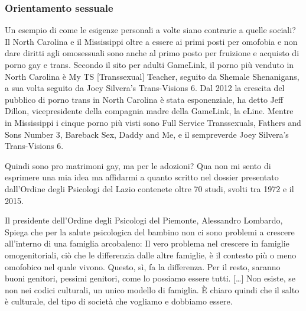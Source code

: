 \documentclass[12pt]{book} %
\begin{document}
\begin{mdframed}
\subsubsection{Orientamento sessuale}

Un esempio di come le esigenze personali a volte siano contrarie a quelle sociali? Il North Carolina e il Mississippi
oltre a essere ai primi posti per omofobia e non dare diritti agli omosessuali sono anche al primo posto per fruizione
e acquisto di porno gay e trans. Secondo il sito per adulti GameLink, il porno più venduto in North Carolina è My TS
[Transsexual] Teacher, seguito da Shemale Shenanigans, a sua volta seguito da Joey Silvera's Trans-Visions 6.
{\textquotedbl}Dal 2012 la crescita del pubblico di porno trans in North Carolina è stata esponenziale,{\textquotedbl}
ha detto Jeff Dillon, vicepresidente della compagnia madre della GameLink, la eLine. Mentre in Mississippi i cinque
porno più visti sono Full Service Transsexuals, Fathers and Sons Number 3, Bareback Sex, Daddy and Me, e il sempreverde
Joey Silvera's Trans-Visions
6.

Quindi sono pro matrimoni gay, ma per le adozioni? Qua non mi sento di esprimere una mia idea ma affidarmi a quanto
scritto nel
dossier presentato dall'Ordine degli Psicologi del Lazio contenete oltre 70 studi, svolti tra 1972 e il 2015. 

Il presidente dell'Ordine degli Psicologi del Piemonte, Alessandro Lombardo, Spiega che per la salute psicologica del
bambino non ci sono problemi a crescere all'interno di una famiglia arcobaleno: {\textquotedbl}Il
vero problema nel crescere in famiglie omogenitoriali, ciò che le differenzia dalle altre famiglie, è il contesto più o
meno omofobico nel quale vivono. Questo, sì, fa la differenza. Per il resto, saranno buoni genitori, pessimi genitori,
come lo possiamo essere tutti. […] Non esiste, se non nei codici culturali, un unico modello di famiglia. È chiaro
quindi che il salto è culturale, del tipo di società che vogliamo e dobbiamo
essere.{\textquotedbl}
\end{mdframed}
\end{document}
